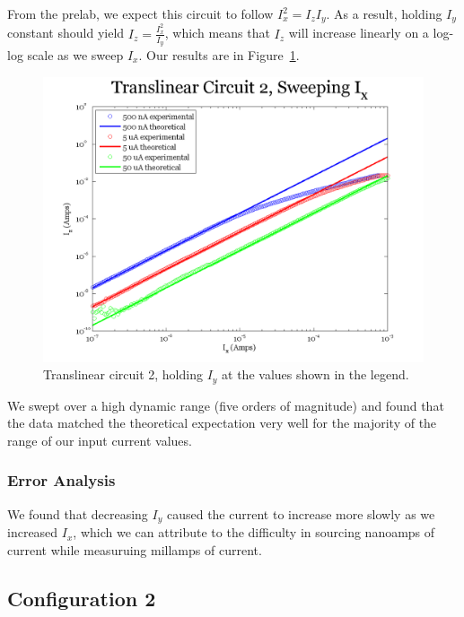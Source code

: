 \documentclass{article}
\begin{document}
From the prelab, we expect this circuit to follow $I_x ^2 = I_z I_y$.  As a result, holding $I_y$ constant should yield $I_z = \frac{I_x^2}{I_y}$, which means that $I_z$ will increase linearly on a log-log scale as we sweep $I_x$.  Our results are in Figure~\ref{fig:tl2sweepx}.

\begin{figure}[H]
\begin{center}
\includegraphics[scale=.75]{exp3_sweepx.png}
\caption{Translinear circuit 2, holding $I_y$ at the values shown in the legend.}
\label{fig:tl2sweepx}
\end{center}
\end{figure}

We swept over a high dynamic range (five orders of magnitude) and found that the data matched the theoretical expectation very well for the majority of the range of our input current values.  

\subsubsection*{Error Analysis}

We found that decreasing $I_y$ caused the current to increase more slowly as we increased $I_x$, which we can attribute to the difficulty in sourcing nanoamps of current while measuruing millamps of current.

\subsection*{Configuration 2}
\end{document}
